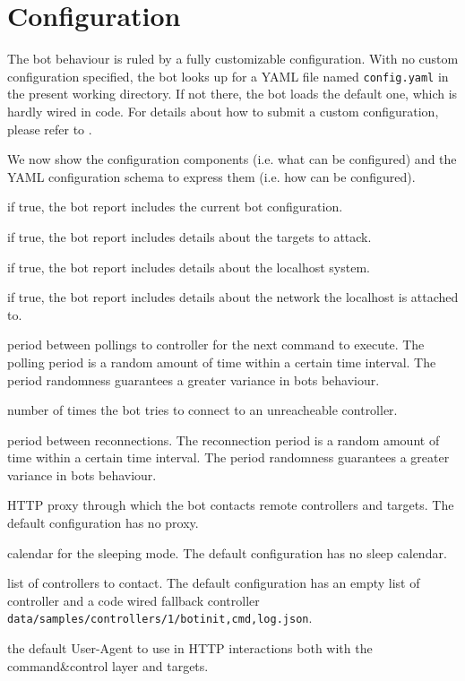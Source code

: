 \section{Configuration}
\label{sec:configuration}

The bot behaviour is ruled by a fully customizable configuration. With no custom configuration specified, the bot looks up for a YAML file named \texttt{config.yaml} in the present working directory. If not there, the bot loads the default one, which is hardly wired in code. For details about how to submit a custom configuration, please refer to .

We now show the configuration components (i.e. what can be configured) and the YAML configuration schema to express them (i.e. how can be configured).

\begin{description}
  \setlength\itemsep{1em}

  \item[cnfInfo] if true, the bot report includes the current bot configuration.

  \item[tgtInfo] if true, the bot report includes details about the targets to attack.

  \item[sysInfo] if true, the bot report includes details about the localhost system.

  \item[netInfo] if true, the bot report includes details about the network the localhost is attached to.

  \item[polling] period between pollings to controller for the next command to execute. The polling period is a random amount of time within a certain time interval. The period randomness guarantees a greater variance in bots behaviour.

  \item[reconnections] number of times the bot tries to connect to an unreacheable controller.

  \item[reconnectionWait] period between reconnections. The reconnection period is a random amount of time within a certain time interval. The period randomness guarantees a greater variance in bots behaviour.

  \item[proxy] HTTP proxy through which the bot contacts remote controllers and targets. The default configuration has no proxy.

  \item[sleep] calendar for the sleeping mode. The default configuration has no sleep calendar.

  \item[controllers] list of controllers to contact. The default configuration has an empty list of controller and a code wired fallback controller \texttt{data/samples/controllers/1/bot{init,cmd,log}.json}.

  \item[userAgent] the default User-Agent to use in HTTP interactions both with the command\&control layer and targets.
\end{description}

